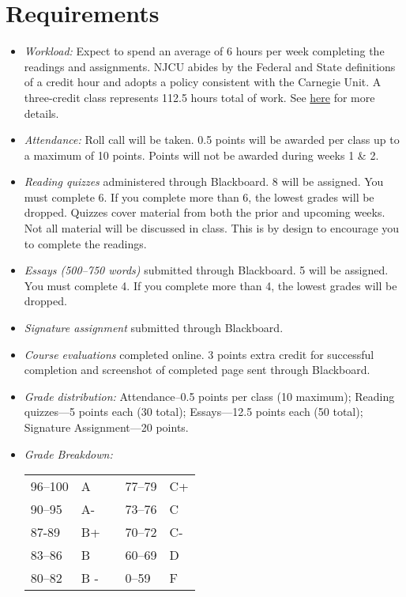 \documentclass[article,oneside]{memoir}
\begin{document}
\section{Requirements}



\begin{itemize}
\item \textit{Workload:} Expect to spend an average of 6 hours per week completing the readings and assignments. NJCU abides by the Federal and State definitions of a credit hour and adopts a policy consistent with the Carnegie Unit. A three-credit class represents 112.5 hours total of work. See \href{http://scottoconnor.org/resources/Credit.pdf}{here} for more details.

\item \textit{Attendance:} Roll call will be taken. 0.5 points will be awarded per class up to a maximum of 10 points. Points will not be awarded during weeks 1 \& 2. 

\item \textit{Reading quizzes} administered through Blackboard. 8  will be assigned. You must complete 6. If you complete more than 6, the lowest grades will be dropped. Quizzes cover material from both the prior and upcoming weeks. Not all material will be discussed in class. This is by design to encourage you to complete the readings. 


\item \textit{Essays (500--750 words)} submitted through Blackboard.  5 will be assigned. You must complete 4. If you complete more than 4, the lowest grades will be dropped. 

\item \textit{Signature assignment} submitted through Blackboard.

\item \textit{Course evaluations} completed online. 3 points extra credit for successful completion and screenshot of completed page sent through Blackboard. 
  
\item \textit{Grade distribution:} Attendance--0.5 points per class (10 maximum); Reading quizzes---5 points each (30 total);  Essays---12.5 points each (50 total); Signature Assignment---20 points.


\item \textit{Grade Breakdown:}

 \begin{tabular}{ | l | l | p{2cm} | l | l | }
    \hline 
96--100 & A  & &  77--79 &  C+ \\  
90--95 & A- & &  73--76 & C \\
87-89 & B+ &  &  70--72 & C- \\ 
83--86 & B  & &  60--69 & D\\
80--82 & B - & & 0--59 & F\\ \hline
    \end{tabular}


\end{itemize}
\end{document}
